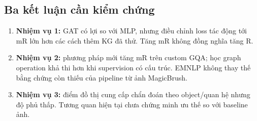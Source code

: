 \subsection{Ba kết luận cần kiểm chứng}
\begin{enumerate}
\item \textbf{Nhiệm vụ 1:} GAT có lợi so với MLP, nhưng điều chỉnh loss
tác động tới mR lớn hơn các cách thêm KG đã thử. Tăng mR không đồng nghĩa tăng R.
\item \textbf{Nhiệm vụ 2:} phương pháp mới tăng mR trên custom GQA; học graph operation
khả thi hơn khi supervision có cấu trúc. EMNLP không thay thế bằng chứng còn thiếu
của pipeline từ ảnh MagicBrush.
\item \textbf{Nhiệm vụ 3:} điểm đồ thị cung cấp chẩn đoán theo object/quan hệ nhưng
độ phủ thấp. Tương quan hiện tại chưa chứng minh ưu thế so với baseline ảnh.
\end{enumerate}
